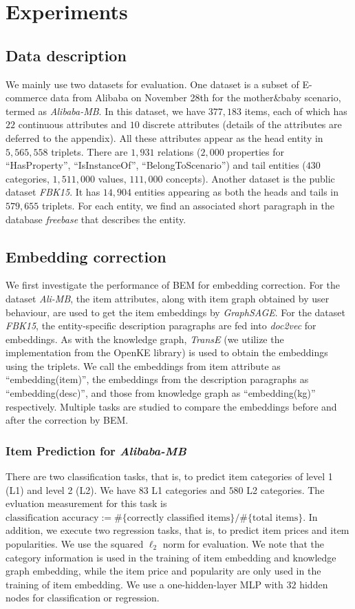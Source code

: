 \section{Experiments}

\subsection{Data description}
We mainly use two datasets for evaluation. One dataset is a subset of E-commerce data from Alibaba on November 28th for the mother\&baby scenario, termed as \textit{Alibaba-MB}. In this dataset, we have $377,183$ items, each of which has $22$ continuous attributes and $10$ discrete attributes (details of the attributes are deferred to the appendix). All these attributes appear as the head entity in $5,565,558$ triplets. There are $1,931$ relations ($2,000$ properties for ``HasProperty'', ``IsInstanceOf'', ``BelongToScenario'') and tail entities ($430$ categories, $1,511,000$ values, $111,000$ concepts). Another dataset is the public dataset \textit{FBK15}. It has $14,904$ entities appearing as both the heads and tails in $579,655$ triplets. For each entity, we find an associated short paragraph in the database \textit{freebase} that describes the entity.


\subsection{Embedding correction}
We first investigate the performance of BEM for embedding correction. For the dataset \textit{Ali-MB}, the item attributes, along with item graph obtained by user behaviour, are used to get the item embeddings by \textit{GraphSAGE}. For the dataset \textit{FBK15}, the entity-specific description paragraphs are fed into \textit{doc2vec} for embeddings. As with the knowledge graph, \textit{TransE} (we utilize the implementation from the OpenKE library) is used to obtain the embeddings using the triplets. We call the embeddings from item attribute as ``embedding(item)'', the embeddings from the description paragraphs as ``embedding(desc)'',  and those from knowledge graph as ``embedding(kg)'' respectively. Multiple tasks are studied to compare the embeddings before and after the correction by BEM.

\subsubsection{Item Prediction for \textit{Alibaba-MB}}\label{sec:item_pred_ali_mb}
There are two classification tasks, that is, to predict item categories of level 1 (L1) and level 2 (L2). We have $83$ L1 categories and $580$ L2 categories. The evluation measurement for this task is $\text{classification accuracy}:= \#\{\text{correctly classified items}\}/\#\{\text{total items}\}$. In addition, we execute two regression tasks, that is, to predict item prices and item popularities. We use the squared $\ell_2$ norm for evaluation. We note that the category information is used in the training of item embedding and knowledge graph embedding, while the item price and popularity are only used in the training of item embedding. We use a one-hidden-layer MLP with $32$ hidden nodes for classification or regression. 

